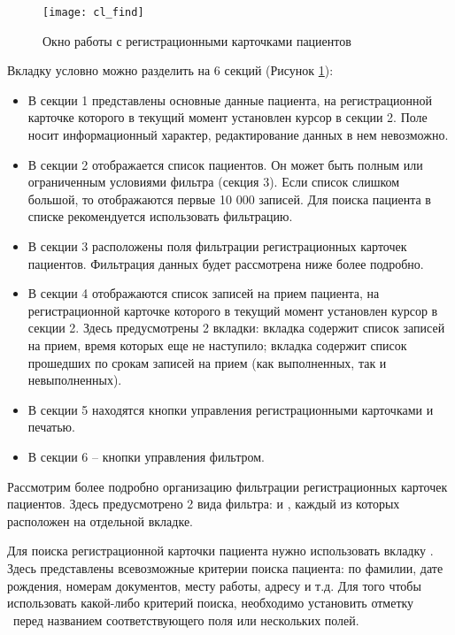 \begin{figure}[ht]\centering
 \texttt{[image: cl\_find]}
 \caption{Окно работы с регистрационными карточками пациентов}
 \label{img_cl_find}
\end{figure} 

Вкладку  условно можно разделить на 6 секций (Рисунок \ref{img_cl_find}):
\begin{itemize}
 \item В секции 1 представлены основные данные пациента, на регистрационной карточке которого в текущий момент установлен курсор в секции 2. Поле носит информационный характер, редактирование данных в нем невозможно.
 \item В секции 2 отображается список пациентов. Он может быть полным или ограниченным условиями фильтра (секция 3). Если список слишком большой, то отображаются первые 10 000 записей. Для поиска пациента в списке рекомендуется использовать фильтрацию.
 \item В секции 3 расположены поля фильтрации регистрационных карточек пациентов. Фильтрация данных будет рассмотрена ниже более подробно.
 \item В секции 4 отображаются список записей на прием пациента, на регистрационной карточке которого в текущий момент установлен курсор в секции 2. Здесь предусмотрены 2 вкладки: вкладка  содержит список записей на прием, время которых еще не наступило; вкладка  содержит список прошедших по срокам записей на прием (как выполненных, так и невыполненных).
 \item	В секции 5 находятся кнопки управления регистрационными карточками и печатью.
 \item	В секции 6 – кнопки управления фильтром.
\end{itemize}

Рассмотрим более подробно организацию фильтрации регистрационных карточек пациентов. Здесь предусмотрено 2 вида фильтра:  и , каждый из которых расположен на отдельной вкладке.

Для поиска регистрационной карточки пациента нужно использовать вкладку . Здесь представлены всевозможные критерии поиска пациента: по фамилии, дате рождения, номерам документов, месту работы, адресу и т.д. Для того чтобы использовать какой-либо критерий поиска, необходимо установить отметку \putx~перед названием соответствующего поля или нескольких полей.

